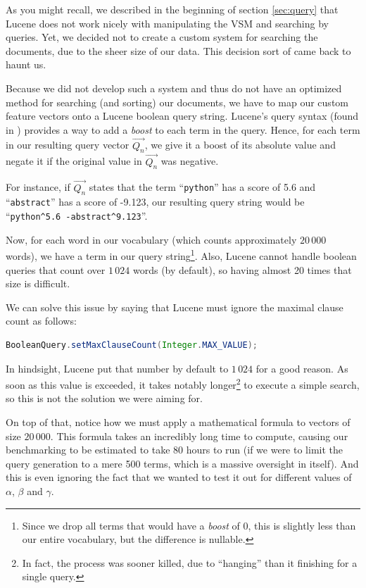 \documentclass[11pt]{article}
\begin{document}
As you might recall, we described in the beginning of section \ref{sec:query} that Lucene does not work nicely with manipulating the VSM and searching by queries. Yet, we decided not to create a custom system for searching the documents, due to the sheer size of our data. This decision sort of came back to haunt us.

Because we did not develop such a system and thus do not have an optimized method for searching (and sorting) our documents, we have to map our custom feature vectors onto a Lucene boolean query string. Lucene's query syntax (found in \cite{lucene}) provides a way to add a \textit{boost} to each term in the query. Hence, for each term in our resulting query vector $\overrightarrow{Q_n}$, we give it a boost of its absolute value and negate it if the original value in $\overrightarrow{Q_n}$ was negative.

For instance, if $\overrightarrow{Q_n}$ states that the term ``\texttt{python}'' has a score of 5.6 and ``\texttt{abstract}'' has a score of -9.123, our resulting query string would be ``\texttt{python\string^5.6 -abstract\string^9.123}''.

Now, for each word in our vocabulary (which counts approximately $20\,000$ words), we have a term in our query string\footnote{Since we drop all terms that would have a \textit{boost} of 0, this is slightly less than our entire vocabulary, but the difference is nullable.}. Also, Lucene cannot handle boolean queries that count over $1\,024$ words (by default), so having almost 20 times that size is difficult.

We can solve this issue by saying that Lucene must ignore the maximal clause count as follows:
\begin{lstlisting}[language=Java]
BooleanQuery.setMaxClauseCount(Integer.MAX_VALUE);
\end{lstlisting}

In hindsight, Lucene put that number by default to $1\,024$ for a good reason. As soon as this value is exceeded, it takes notably longer\footnote{In fact, the process was sooner killed, due to ``hanging'' than it finishing for a single query.} to execute a simple search, so this is not the solution we were aiming for.

On top of that, notice how we must apply a mathematical formula to vectors of size $20\,000$. This formula takes an incredibly long time to compute, causing our benchmarking to be estimated to take 80 hours to run (if we were to limit the query generation to a mere 500 terms, which is a massive oversight in itself). And this is even ignoring the fact that we wanted to test it out for different values of $\alpha$, $\beta$ and $\gamma$.
\end{document}

